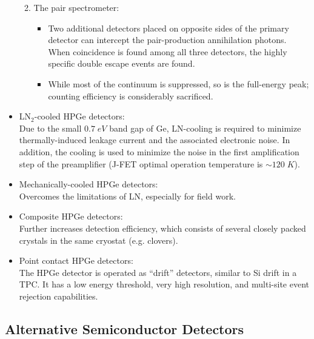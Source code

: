 \begin{itemize}
\begin{enumerate}
\begin{itemize}
            \end{itemize}
        \item The pair spectrometer: 
        \begin{itemize}
            \item Two additional detectors placed on opposite sides of the primary detector can intercept the pair-production annihilation photons. When coincidence is found among all three detectors, the highly specific double escape events are found.
            \item While most of the continuum is suppressed, so is the full-energy peak; counting efficiency is considerably sacrificed. 
        \end{itemize}
    \end{enumerate}
    \item LN$_2$-cooled HPGe detectors:\\
    Due to the small $0.7\;eV$ band gap of Ge, LN-cooling is required to minimize thermally-induced leakage current and the associated electronic noise. In addition, the cooling is used to minimize the noise in the first amplification step of the preamplifier (J-FET optimal operation temperature is $\sim120\;K$). 
    \item Mechanically-cooled HPGe detectors:\\
    Overcomes the limitations of LN, especially for field work.
    \item Composite HPGe detectors:\\
    Further increases detection efficiency, which consists of several closely packed crystals in the same cryostat (e.g. clovers).
    \item Point contact HPGe detectors:\\
    The HPGe detector is operated as ``drift'' detectors, similar to Si drift in a TPC. It has a low energy threshold, very high resolution, and multi-site event rejection capabilities. 
\end{itemize}

\subsection{Alternative Semiconductor Detectors}

